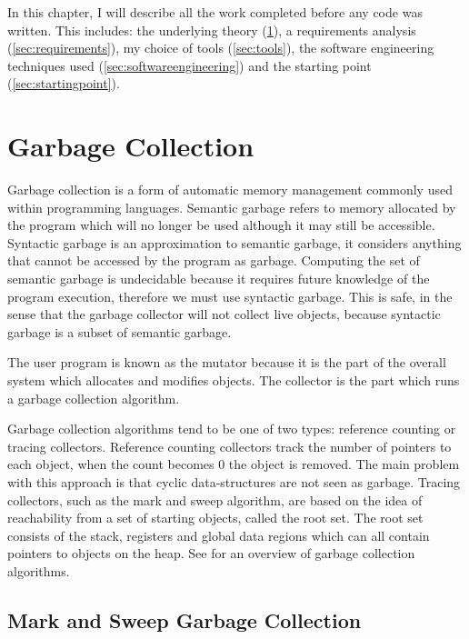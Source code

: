 \documentclass[../diss.tex]{subfiles}
\begin{document}
In this chapter, I will describe all the work completed before any code was written. This includes: the underlying theory (\cref{sec:gctheory}), a requirements analysis (\cref{sec:requirements}), my choice of tools (\cref{sec:tools}), the software engineering techniques used (\cref{sec:softwareengineering}) and the starting point (\cref{sec:startingpoint}).

\section{Garbage Collection} \label{sec:gctheory}

Garbage collection is a form of automatic memory management commonly used within programming languages. Semantic garbage refers to memory allocated by the program which will no longer be used although it may still be accessible. Syntactic garbage is an approximation to semantic garbage, it considers anything that cannot be accessed by the program as garbage. Computing the set of semantic garbage is undecidable because it requires future knowledge of the program execution, therefore we must use syntactic garbage. This is safe, in the sense that the garbage collector will not collect live objects, because syntactic garbage is a subset of semantic garbage.

The user program is known as the mutator because it is the part of the overall system which allocates and modifies objects. The collector is the part which runs a garbage collection algorithm.

Garbage collection algorithms tend to be one of two types: reference counting or tracing collectors. Reference counting collectors \cite{referencecounting} track the number of pointers to each object, when the count becomes 0 the object is removed. The main problem with this approach is that cyclic data-structures are not seen as garbage. Tracing collectors, such as the mark and sweep algorithm, are based on the idea of reachability from a set of starting objects, called the root set. The root set consists of the stack, registers and global data regions which can all contain pointers to objects on the heap. See \cite{overview} for an overview of garbage collection algorithms.


\subsection{Mark and Sweep Garbage Collection} \label{sec:markandsweep}
\end{document}
